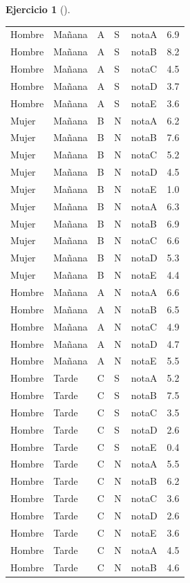 \documentclass[
  a4paper,
]{scrreport}
\theoremstyle{definition}
\newtheorem{exercise}{Ejercicio}[chapter]
\theoremstyle{remark}
\begin{document}
\begin{exercise}[]
\begin{enumerate}
\begin{tcolorbox}
\begin{longtable}[]{@{}lllllr@{}}
  Hombre & Mañana & A & S & notaA & 6.9 \\
  Hombre & Mañana & A & S & notaB & 8.2 \\
  Hombre & Mañana & A & S & notaC & 4.5 \\
  Hombre & Mañana & A & S & notaD & 3.7 \\
  Hombre & Mañana & A & S & notaE & 3.6 \\
  Mujer & Mañana & B & N & notaA & 6.2 \\
  Mujer & Mañana & B & N & notaB & 7.6 \\
  Mujer & Mañana & B & N & notaC & 5.2 \\
  Mujer & Mañana & B & N & notaD & 4.5 \\
  Mujer & Mañana & B & N & notaE & 1.0 \\
  Mujer & Mañana & B & N & notaA & 6.3 \\
  Mujer & Mañana & B & N & notaB & 6.9 \\
  Mujer & Mañana & B & N & notaC & 6.6 \\
  Mujer & Mañana & B & N & notaD & 5.3 \\
  Mujer & Mañana & B & N & notaE & 4.4 \\
  Hombre & Mañana & A & N & notaA & 6.6 \\
  Hombre & Mañana & A & N & notaB & 6.5 \\
  Hombre & Mañana & A & N & notaC & 4.9 \\
  Hombre & Mañana & A & N & notaD & 4.7 \\
  Hombre & Mañana & A & N & notaE & 5.5 \\
  Hombre & Tarde & C & S & notaA & 5.2 \\
  Hombre & Tarde & C & S & notaB & 7.5 \\
  Hombre & Tarde & C & S & notaC & 3.5 \\
  Hombre & Tarde & C & S & notaD & 2.6 \\
  Hombre & Tarde & C & S & notaE & 0.4 \\
  Hombre & Tarde & C & N & notaA & 5.5 \\
  Hombre & Tarde & C & N & notaB & 6.2 \\
  Hombre & Tarde & C & N & notaC & 3.6 \\
  Hombre & Tarde & C & N & notaD & 2.6 \\
  Hombre & Tarde & C & N & notaE & 3.6 \\
  Hombre & Tarde & C & N & notaA & 4.5 \\
  Hombre & Tarde & C & N & notaB & 4.6 \\

\end{longtable}
\end{tcolorbox}
\end{enumerate}
\end{exercise}
\end{document}
